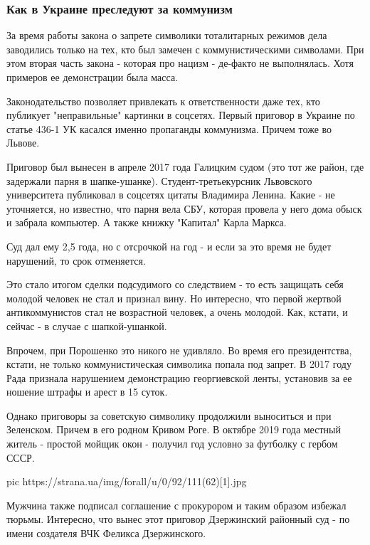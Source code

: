 \subsubsection{Как в Украине преследуют за коммунизм}

За время работы закона о запрете символики тоталитарных режимов дела заводились
только на тех, кто был замечен с коммунистическими символами. При этом вторая
часть закона - которая про нацизм - де-факто не выполнялась. Хотя примеров ее
демонстрации была масса. 

Законодательство позволяет привлекать к ответственности даже тех, кто публикует
"неправильные" картинки в соцсетях. Первый приговор в Украине по статье 436-1
УК касался именно пропаганды коммунизма. Причем тоже во Львове.

Приговор был вынесен в апреле 2017 года Галицким судом (это тот же район, где
задержали парня в шапке-ушанке). Студент-третьекурсник Львовского университета
публиковал в соцсетях цитаты Владимира Ленина. Какие - не уточняется, но
известно, что парня вела СБУ, которая провела у него дома обыск и забрала
компьютер. А также книжку "Капитал" Карла Маркса. 

Суд дал ему 2,5 года, но с отсрочкой на год - и если за это время не будет
нарушений, то срок отменяется. 

Это стало итогом сделки подсудимого со следствием - то есть защищать себя
молодой человек не стал и признал вину. Но интересно, что первой жертвой
антикоммунистов стал не возрастной человек, а очень молодой. Как, кстати, и
сейчас - в случае с шапкой-ушанкой. 

Впрочем, при Порошенко это никого не удивляло. Во время его президентства,
кстати, не только коммунистическая символика попала под запрет. В 2017 году
Рада признала нарушением демонстрацию георгиевской ленты, установив за ее
ношение штрафы и арест в 15 суток. 

Однако приговоры за советскую символику продолжили выноситься и при Зеленском.
Причем в его родном Кривом Роге. В октябре 2019 года местный житель - простой
мойщик окон - получил год условно за футболку с гербом СССР. 

\ifcmt
  pic https://strana.ua/img/forall/u/0/92/111(62)[1].jpg
\fi

Мужчина также подписал соглашение с прокурором и таким образом избежал тюрьмы.
Интересно, что вынес этот приговор Дзержинский районный суд - по имени
создателя ВЧК Феликса Дзержинского. 


